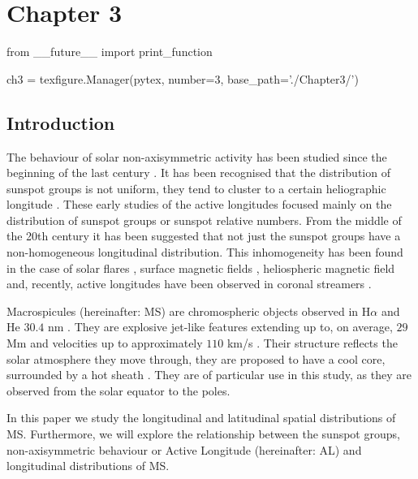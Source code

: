 \chapter{Chapter 3}\label{ch:3}  %

\begin{pycode}[chapter3]
from __future__ import print_function

ch3 = texfigure.Manager(pytex, number=3, base_path='./Chapter3/')
\end{pycode}

\section{Introduction}
The behaviour of solar non-axisymmetric activity has been studied since the beginning of the last century \citep{Chidambara}. It has been recognised that the distribution of sunspot groups is not uniform, they tend to cluster to a certain heliographic longitude \citep{Bumba,Balthasar,Wilkinson}. These early studies of the active longitudes focused mainly on the distribution of sunspot groups or sunspot relative numbers. From the middle of the 20th century it has been suggested that not just the sunspot groups have a non-homogeneous longitudinal distribution. This inhomogeneity has been found in the case of solar flares \citep{Zhang}, surface magnetic fields \citep{Benevolenskaya}, heliospheric magnetic field \citep{Mursula} and, recently, active longitudes have been observed in coronal streamers \citep{Jing}.

\newpage
Macrospicules (hereinafter: MS) are chromospheric objects observed in H$\alpha$ and He $30.4$ nm \citep{Bohlin,Wang,Murawski,Scullion}. They are explosive jet-like features extending up to, on average, $29$ Mm and velocities up to approximately $110$ km/s \citep{Zaqarashvili}. Their structure reflects the solar atmosphere they move through, they are proposed to have a cool core, surrounded by a hot sheath \citep{Parenti}. They are of particular use in this study, as they are observed from the solar equator to the poles. 

In this paper we study the longitudinal and latitudinal spatial distributions of MS. Furthermore, we will explore the relationship between the sunspot groups, non-axisymmetric behaviour or Active Longitude (hereinafter: AL) and longitudinal distributions of MS.


